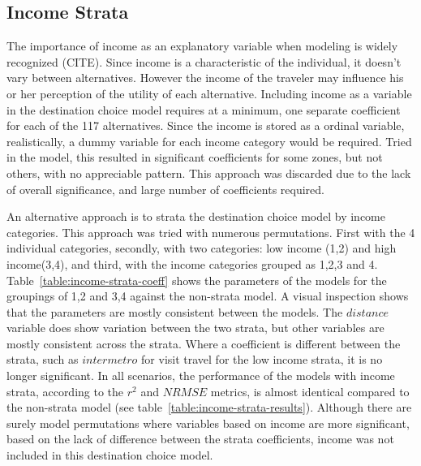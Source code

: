 \subsection{Income Strata}
The importance of income as an explanatory variable when modeling is widely recognized (CITE). Since income is a characteristic of the individual, it doesn't vary between alternatives. However the income of the traveler may influence his or her perception of the utility of each alternative. Including income as a variable in the destination choice model requires at a minimum, one separate coefficient for each of the 117 alternatives. Since the income is stored as a ordinal variable, realistically, a dummy variable for each income category would be required. Tried in the model, this resulted in significant coefficients for some zones, but not others, with no appreciable pattern. This approach was discarded due to the lack of overall significance, and large number of coefficients required. 

An alternative approach is to strata the destination choice model by income categories. This approach was tried with numerous permutations. First with the 4 individual categories, secondly, with two categories: low income (1,2) and high income(3,4), and third, with the income categories grouped as {1,2,3} and {4}. Table~\ref{table:income-strata-coeff} shows the parameters of the models for the groupings of {1,2} and {3,4} against the non-strata model. A visual inspection shows that the parameters are mostly consistent between the models. The $distance$ variable does show variation between the two strata, but other variables are mostly consistent across the strata. Where a coefficient is different between the strata, such as $intermetro$ for visit travel for the low income strata, it is no longer significant. In all scenarios, the performance of the models with income strata, according to the $r^2$ and $NRMSE$ metrics, is almost identical compared to the non-strata model (see table~\ref{table:income-strata-results}). Although there are surely model permutations where variables based on income are more significant, based on the lack of difference between the strata coefficients, income was not included in this destination choice model.


